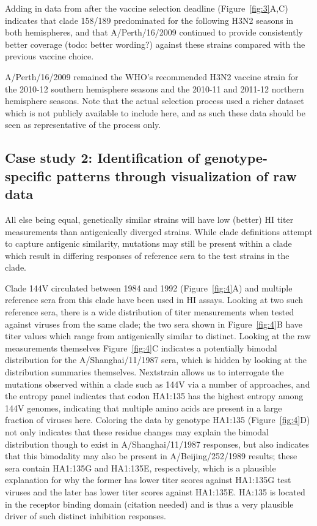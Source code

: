 \documentclass[utf8]{FrontiersinHarvard} %
\begin{document}
Adding in data from after the vaccine selection deadline (Figure~\ref{fig:3}A,C) indicates that clade 158/189 predominated for the following H3N2 seasons in both hemispheres, and that A/Perth/16/2009 continued to provide consistently better coverage (todo: better wording?) against these strains compared with the previous vaccine choice.


A/Perth/16/2009 remained the WHO's recommended H3N2 vaccine strain for the 2010-12 southern hemisphere seasons and the 2010-11 and 2011-12 northern hemisphere seasons. Note that the actual selection process used a richer dataset which is not publicly available to include here, and as such these data should be seen as representative of the process only.


\subsection{Case study 2: Identification of genotype-specific patterns through visualization of raw data}

All else being equal, genetically similar strains will have low (better) HI titer measurements than antigenically diverged strains.
While clade definitions attempt to capture antigenic similarity, mutations may still be present within a clade which result in differing responses of reference sera to the test strains in the clade.


Clade 144V circulated between 1984 and 1992 (Figure~\ref{fig:4}A) and multiple reference sera from this clade have been used in HI assays.
Looking at two such reference sera, there is a wide distribution of titer measurements when tested against viruses from the same clade; the two sera shown in Figure~\ref{fig:4}B have titer values which range from antigenically similar to distinct.
Looking at the raw measurements themselves Figure~\ref{fig:4}C indicates a potentially bimodal distribution for the A/Shanghai/11/1987 sera, which is hidden by looking at the distribution summaries themselves.
Nextstrain allows us to interrogate the mutations observed within a clade such as 144V via a number of approaches, and the entropy panel indicates that codon HA1:135 has the highest entropy among 144V genomes, indicating that multiple amino acids are present in a large fraction of viruses here.
Coloring the data by genotype HA1:135 (Figure~\ref{fig:4}D) not only indicates that these residue changes may explain the bimodal distribution though to exist in A/Shanghai/11/1987 responses, but also indicates that this bimodality may also be present in A/Beijing/252/1989 results; these sera contain HA1:135G and HA1:135E, respectively, which is a plausible explanation for why the former has lower titer scores against HA1:135G test viruses and the later has lower titer scores against HA1:135E.
HA:135 is located in the receptor binding domain (citation needed) and is thus a very plausible driver of such distinct inhibition responses.
\end{document}
